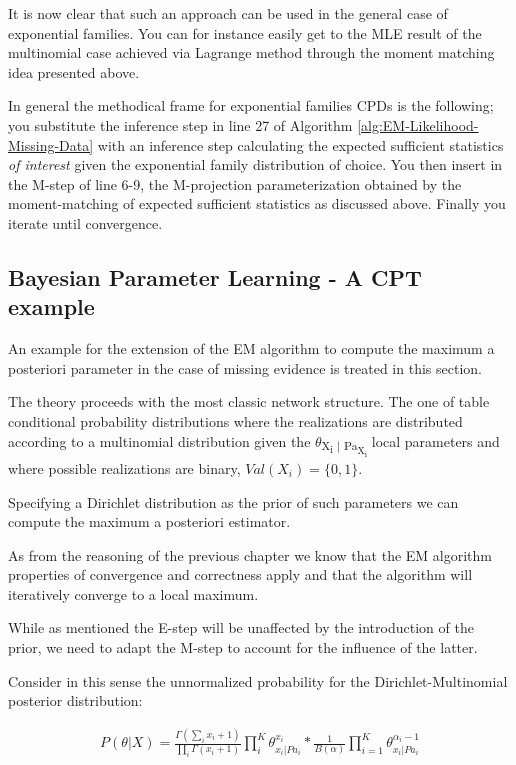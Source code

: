 \documentclass[11pt]{article}
\begin{document}
\begin{article}
It is now clear that such an approach can be used in the general
case of exponential families. You can for instance easily get to
the MLE result of the multinomial case achieved via Lagrange method
through the moment matching idea presented above.

In general the methodical frame for exponential families CPDs is
the following; you substitute the inference step in line 27 of
Algorithm \ref{alg:EM-Likelihood-Missing-Data} with an inference step
calculating the expected sufficient statistics \emph{of interest} given
the exponential family distribution of choice. You then insert in
the M-step of line 6-9, the M-projection parameterization obtained
by the moment-matching of expected sufficient statistics as
discussed above. Finally you iterate until convergence.

\subsection{Bayesian Parameter Learning - A CPT example}
\label{cpt:cpt_bayes_learning}
An example for the extension of the EM algorithm to compute the
maximum a posteriori parameter in the case of missing evidence is
treated in this section.

The theory proceeds with the most classic network structure. The
one of table conditional probability distributions where the
realizations are distributed according to a multinomial
distribution given the \(\theta\)\textsubscript{X\textsubscript{i} | Pa\textsubscript{X\textsubscript{i}}} local parameters and
where possible realizations are binary, \(Val(X_i) = \{0,1 \}\).

Specifying a Dirichlet distribution as the prior of such parameters
we can compute the maximum a posteriori estimator.

As from the reasoning of the previous chapter we know that the EM
algorithm properties of convergence and correctness apply and that
the algorithm will iteratively converge to a local maximum.

While as mentioned the E-step will be unaffected by the
introduction of the prior, we need to adapt the M-step to account
for the influence of the latter.

Consider in this sense the unnormalized probability for the
Dirichlet-Multinomial posterior distribution:

\begin{align} \label{eq:dirichlet-multinomial-score}
P(\theta | X) = \frac{\Gamma(\sum_i x_i + 1)}{\prod_i \Gamma(x_i + 1)} \prod_i^K \theta_{x_i | Pa_i}^{x_i}  * \frac{1}{B(\alpha)} \prod_{i=1}^K \theta_{x_i | Pa_i}^{\alpha_i - 1}
\end{align}


\end{article}
\end{document}
